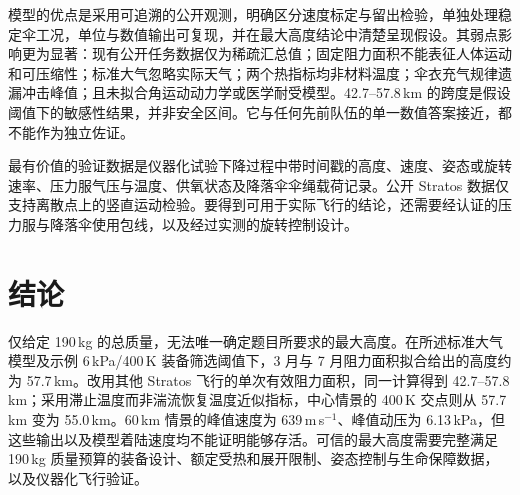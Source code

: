 \documentclass[11pt,a4paper]{article}
\begin{document}
模型的优点是采用可追溯的公开观测，明确区分速度标定与留出检验，单独处理稳定伞工况，单位与数值输出可复现，并在最大高度结论中清楚呈现假设。其弱点影响更为显著：现有公开任务数据仅为稀疏汇总值；固定阻力面积不能表征人体运动和可压缩性；标准大气忽略实际天气；两个热指标均非材料温度；伞衣充气规律遗漏冲击峰值；且未拟合角运动动力学或医学耐受模型。42.7--57.8\,km 的跨度是假设阈值下的敏感性结果，并非安全区间。它与任何先前队伍的单一数值答案接近，都不能作为独立佐证。

最有价值的验证数据是仪器化试验下降过程中带时间戳的高度、速度、姿态或旋转速率、压力服气压与温度、供氧状态及降落伞伞绳载荷记录。公开 Stratos 数据仅支持离散点上的竖直运动检验。要得到可用于实际飞行的结论，还需要经认证的压力服与降落伞使用包线，以及经过实测的旋转控制设计。

\section{结论}
仅给定 190\,kg 的总质量，无法唯一确定题目所要求的最大高度。在所述标准大气模型及示例 6\,kPa/400\,K 装备筛选阈值下，3 月与 7 月阻力面积拟合给出的高度约为 57.7\,km。改用其他 Stratos 飞行的单次有效阻力面积，同一计算得到 42.7--57.8\,km；采用滞止温度而非湍流恢复温度近似指标，中心情景的 400\,K 交点则从 57.7\,km 变为 55.0\,km。60\,km 情景的峰值速度为 639\,m\,s$^{-1}$、峰值动压为 6.13\,kPa，但这些输出以及模型着陆速度均不能证明能够存活。可信的最大高度需要完整满足 190\,kg 质量预算的装备设计、额定受热和展开限制、姿态控制与生命保障数据，以及仪器化飞行验证。
\end{document}
